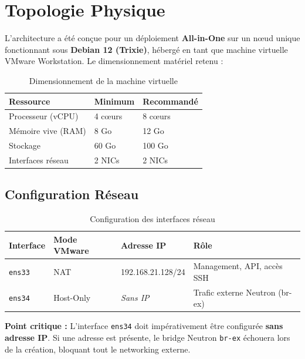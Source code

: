 \documentclass[12pt,a4paper,oneside]{book}
\begin{document}
\section{Topologie Physique}

L'architecture a \'et\'e con\c{c}ue pour un d\'eploiement \textbf{All-in-One} sur un n\oe{}ud unique fonctionnant sous \textbf{Debian 12 (Trixie)}, h\'eberg\'e en tant que machine virtuelle VMware Workstation. Le dimensionnement mat\'eriel retenu :

\begin{table}[H]
\centering
\caption{Dimensionnement de la machine virtuelle}
\begin{tabular}{|l|l|l|}
\hline
\textbf{Ressource} & \textbf{Minimum} & \textbf{Recommand\'e} \\
\hline
Processeur (vCPU) & 4 c\oe urs & 8 c\oe urs \\
\hline
M\'emoire vive (RAM) & 8 Go & 12 Go \\
\hline
Stockage & 60 Go & 100 Go \\
\hline
Interfaces r\'eseau & 2 NICs & 2 NICs \\
\hline
\end{tabular}
\label{tab:dimensionnement}
\end{table}

\subsection{Configuration R\'eseau}

\begin{table}[H]
\centering
\caption{Configuration des interfaces r\'eseau}
\begin{tabularx}{\textwidth}{|l|l|l|X|}
\hline
\textbf{Interface} & \textbf{Mode VMware} & \textbf{Adresse IP} & \textbf{R\^ole} \\
\hline
\texttt{ens33} & NAT & 192.168.21.128/24 & Management, API, acc\`es SSH \\
\hline
\texttt{ens34} & Host-Only & \textit{Sans IP} & Trafic externe Neutron (br-ex) \\
\hline
\end{tabularx}
\label{tab:network_interfaces}
\end{table}

\textbf{Point critique :} L'interface \texttt{ens34} doit imp\'erativement \^etre configur\'ee \textbf{sans adresse IP}. Si une adresse est pr\'esente, le bridge Neutron \texttt{br-ex} \'echouera lors de la cr\'eation, bloquant tout le networking externe.
\end{document}
